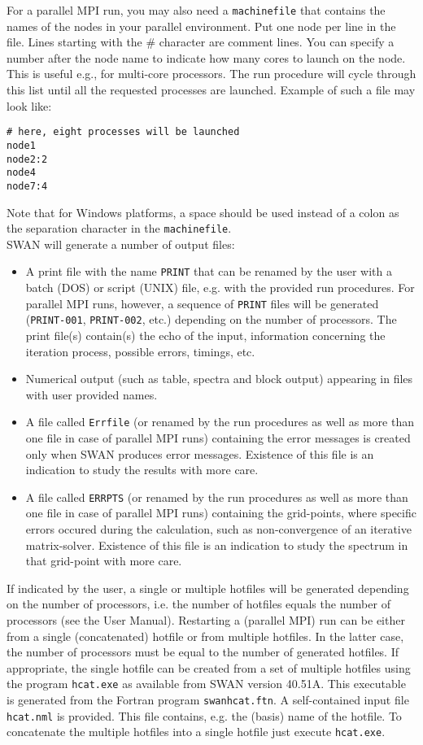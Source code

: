 \documentclass[12pt]{book}
\begin{document}
\noindent
For a parallel MPI run, you may also need a {\tt machinefile} that contains the names of the
nodes in your parallel environment. Put one node per line in the file. Lines starting with
the \# character are comment lines. You can specify a number after the node name to indicate
how many cores to launch on the node. This is useful e.g., for multi-core processors. The run
procedure will cycle through this list until all the requested processes are launched. Example
of such a file may look like:
\begin{verbatim}
# here, eight processes will be launched
node1
node2:2
node4
node7:4
\end{verbatim}
Note that for Windows platforms, a space should be used instead of a colon as the separation
character in the {\tt machinefile}.
\\[2ex]
\noindent
SWAN will generate a number of output files:
\begin{itemize}
   \item A print file with the name {\tt PRINT} that can be renamed by the user with a batch (DOS) or
         script (UNIX) file, e.g. with the provided run procedures. For parallel MPI runs, however,
         a sequence of {\tt PRINT} files will be generated ({\tt PRINT-001}, {\tt PRINT-002}, etc.)
         depending on the number of processors. The print file(s) contain(s) the echo of the input,
         information concerning the iteration process, possible errors, timings, etc.
   \item Numerical output (such as table, spectra and block output) appearing in files with user
         provided names.
   \item A file called {\tt Errfile} (or renamed by the run procedures as well as more than one file in
         case of parallel MPI runs) containing the error messages is created only when SWAN produces
         error messages. Existence of this file is an indication to study the results with more care.
   \item A file called {\tt ERRPTS} (or renamed by the run procedures as well as more than one file in
         case of parallel MPI runs) containing the grid-points, where specific errors occured during
         the calculation, such as non-convergence of an iterative matrix-solver. Existence of this file
         is an indication to study the spectrum in that grid-point with more care.
\end{itemize}
If indicated by the user, a single or multiple hotfiles will be generated depending on the number of
processors, i.e. the number of hotfiles equals the number of processors (see the User Manual). Restarting
a (parallel MPI) run can be either from a single (concatenated) hotfile or from multiple hotfiles.
In the latter case, the number of processors must be equal to the number of generated hotfiles. If
appropriate, the single hotfile can be created from a set of multiple hotfiles using the program
{\tt hcat.exe} as available from SWAN version 40.51A. This executable is generated from the Fortran
program {\tt swanhcat.ftn}. A self-contained input file {\tt hcat.nml} is provided. This file contains,
e.g. the (basis) name of the hotfile. To concatenate the multiple hotfiles into a single hotfile just execute
{\tt hcat.exe}.
\end{document}

